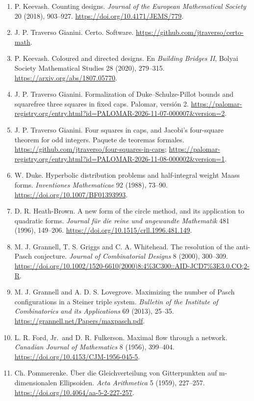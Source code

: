 \documentclass[spanish,11pt,a4paper]{article}
\begin{document}
\begin{enumerate}
\item
  P. Keevash. Counting designs. \emph{Journal of the European Mathematical Society} 20 (2018), 903--927. \url{https://doi.org/10.4171/JEMS/779}.
\item
  J. P. Traverso Gianini. Certo. Software. \url{https://github.com/jtraverso/certo-math}.
\item
  P. Keevash. Coloured and directed designs. En \emph{Building Bridges II}, Bolyai Society Mathematical Studies 28 (2020), 279--315. \url{https://arxiv.org/abs/1807.05770}.
\item
  J. P. Traverso Gianini. Formalization of Duke--Schulze-Pillot bounds and squarefree three squares in fixed caps. Palomar, versión 2. \url{https://palomar-registry.org/entry.html?id=PALOMAR-2026-11-07-000007&version=2}.
\item
  J. P. Traverso Gianini. Four squares in caps, and Jacobi's four-square theorem for odd integers. Paquete de teoremas formales. \url{https://github.com/jtraverso/four-squares-in-caps}; \url{https://palomar-registry.org/entry.html?id=PALOMAR-2026-11-08-000002&version=1}.
\item
  W. Duke. Hyperbolic distribution problems and half-integral weight Maass forms. \emph{Inventiones Mathematicae} 92 (1988), 73--90. \url{https://doi.org/10.1007/BF01393993}.
\item
  D. R. Heath-Brown. A new form of the circle method, and its application to quadratic forms. \emph{Journal für die reine und angewandte Mathematik} 481 (1996), 149--206. \url{https://doi.org/10.1515/crll.1996.481.149}.
\item
  M. J. Grannell, T. S. Griggs and C. A. Whitehead. The resolution of the anti-Pasch conjecture. \emph{Journal of Combinatorial Designs} 8 (2000), 300--309. \url{https://doi.org/10.1002/1520-6610(2000)8:4\%3C300::AID-JCD7\%3E3.0.CO;2-R}.
\item
  M. J. Grannell and A. D. S. Lovegrove. Maximizing the number of Pasch configurations in a Steiner triple system. \emph{Bulletin of the Institute of Combinatorics and its Applications} 69 (2013), 25--35. \url{https://grannell.net/Papers/maxpasch.pdf}.
\item
  L. R. Ford, Jr.~and D. R. Fulkerson. Maximal flow through a network. \emph{Canadian Journal of Mathematics} 8 (1956), 399--404. \url{https://doi.org/10.4153/CJM-1956-045-5}.
\item
  Ch. Pommerenke. Über die Gleichverteilung von Gitterpunkten auf m-dimensionalen Ellipsoiden. \emph{Acta Arithmetica} 5 (1959), 227--257. \url{https://doi.org/10.4064/aa-5-2-227-257}.
\end{enumerate}
\end{document}
